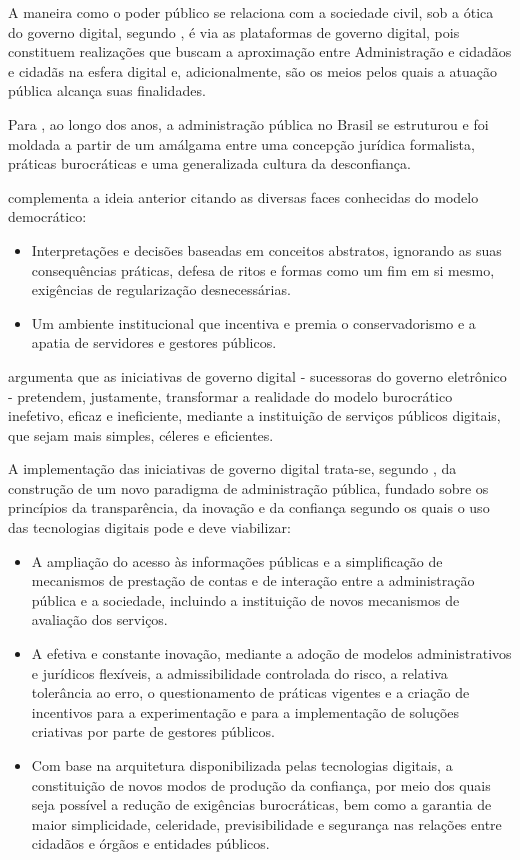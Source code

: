 A maneira como o poder público se relaciona com a sociedade civil, sob a ótica do governo digital, segundo  \cite{lima2023governo}, é via as plataformas de governo digital, pois constituem realizações que buscam a aproximação entre Administração e cidadãos e cidadãs na esfera digital e, adicionalmente, são os meios pelos quais a atuação pública alcança suas finalidades.

Para \cite{de2020governo}, ao longo dos anos, a administração pública no Brasil se estruturou e foi moldada a partir de um amálgama entre uma concepção jurídica formalista, práticas burocráticas e uma generalizada cultura da desconfiança. 

\cite{de2020governo} complementa a ideia anterior citando as diversas faces 
conhecidas do modelo democrático:  

\begin{itemize}
    \item Interpretações e decisões baseadas em conceitos abstratos, ignorando as suas consequências práticas, defesa de ritos e formas como um fim em si mesmo, exigências de regularização desnecessárias.
    \item Um ambiente institucional que incentiva e premia o conservadorismo e a apatia de servidores e gestores públicos.
\end{itemize}

\cite{de2020governo} argumenta que as iniciativas de governo digital - sucessoras do governo eletrônico - pretendem, justamente, transformar a realidade do modelo burocrático inefetivo, eficaz  e ineficiente, mediante a instituição de serviços públicos digitais, que sejam mais simples, céleres e eficientes.

A implementação das iniciativas de governo digital trata-se, segundo \cite{de2020governo}, da construção de um novo paradigma  de administração pública, fundado sobre os princípios da transparência, da inovação e da confiança  segundo os quais o uso das tecnologias digitais pode e deve viabilizar: 

\begin{itemize}
    \item A ampliação do acesso às informações públicas e a simplificação de 
    mecanismos de prestação de contas e de interação entre a administração 
    pública e a sociedade, incluindo a instituição de novos mecanismos de 
    avaliação dos serviços.
    \item A efetiva e constante inovação, mediante a adoção de modelos 
    administrativos e jurídicos flexíveis, a admissibilidade controlada do risco, a relativa tolerância ao erro, o questionamento de práticas vigentes e a criação de incentivos para a experimentação e para a implementação de soluções criativas por parte de gestores públicos.
    \item Com base na arquitetura disponibilizada pelas tecnologias digitais, a constituição de novos modos de produção da confiança, por meio dos quais seja possível a redução de exigências burocráticas, bem como a garantia de maior simplicidade, celeridade, previsibilidade e segurança nas relações entre cidadãos e órgãos e entidades públicos.
\end{itemize}

